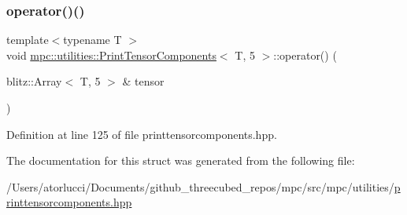 \subsubsection{\texorpdfstring{operator()()}{operator()()}}
{\footnotesize\ttfamily template$<$typename T $>$ \\
void \mbox{\hyperlink{structmpc_1_1utilities_1_1_print_tensor_components}{mpc\+::utilities\+::\+Print\+Tensor\+Components}}$<$ T, 5 $>$\+::operator() (\begin{DoxyParamCaption}\item[{blitz\+::\+Array$<$ T, 5 $>$ \&}]{tensor }\end{DoxyParamCaption})\hspace{0.3cm}{\ttfamily [inline]}}



Definition at line 125 of file printtensorcomponents.\+hpp.



The documentation for this struct was generated from the following file\+:\begin{DoxyCompactItemize}
\item 
/\+Users/atorlucci/\+Documents/github\+\_\+threecubed\+\_\+repos/mpc/src/mpc/utilities/\mbox{\hyperlink{printtensorcomponents_8hpp}{printtensorcomponents.\+hpp}}\end{DoxyCompactItemize}
